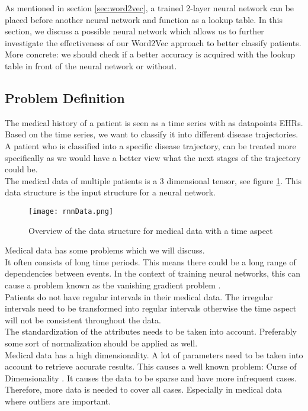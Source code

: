 As mentioned in section \ref{sec:word2vec}, a trained 2-layer neural network can be placed before another neural network and function as a lookup table. In this section, we discuss a possible neural network which allows us to further investigate the effectiveness of our Word2Vec approach to better classify patients. More concrete: we should check if a better accuracy is acquired with the lookup table in front of the neural network or without. 

\subsection{Problem Definition}
\label{sec:problem}

The medical history of a patient is seen as a time series with as datapoints EHRs. Based on the time series, we want to classify it into different disease trajectories. A patient who is classified into a specific disease trajectory, can be treated more specifically as we would have a better view what the next stages of the trajectory could be. \\

The medical data of multiple patients is a $3$ dimensional tensor, see figure \ref{fig:rnnData}. This data structure is the input structure for a neural network.

\begin{figure}[!htb]
	\centering
	\texttt{[image: rnnData.png]}
	\caption{Overview of the data structure for medical data with a time aspect \cite{dl4jRnn:online}}
	\label{fig:rnnData}
\end{figure} 

Medical data has some problems which we will discuss.\\
It often consists of long time periods. This means there could be a long range of dependencies between events. In the context of training neural networks, this can cause a problem known as the vanishing gradient problem \cite{vanishingproblem:article}. \\
Patients do not have regular intervals in their medical data. The irregular intervals need to be transformed into regular intervals otherwise the time aspect will not be consistent throughout the data. \\
The standardization of the attributes needs to be taken into account. Preferably some sort of normalization should be applied as well. \\
Medical data has a high dimensionality. A lot of parameters need to be taken into account to retrieve accurate results. This causes a well known problem: Curse of Dimensionality \cite {curseofdim:book}. It causes the data to be sparse and have more infrequent cases. Therefore, more data is needed to cover all cases. Especially in medical data where outliers are important. 


